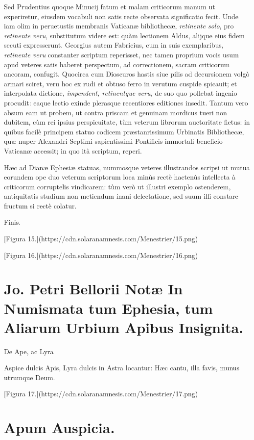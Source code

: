 \documentclass[a4paper, 11pt, oneside, polutonikogreek, latin]{article}
\begin{document}
Sed Prudentius quoque Minucij fatum et malam criticorum manum ut experiretur, eiusdem vocabuli non satis recte observata significatio fecit. Unde iam olim in peruetustis membranis Vaticanæ bibliothecæ, \emph{retinente solo}, pro \emph{retinente veru}, substitutum videre est: quàm lectionem Aldus, alijque eius fidem secuti expresserunt. Georgius autem Fabricius, cum in suis exemplaribus, \emph{retinente veru} constanter scriptum reperisset, nec tamen proprium vocis usum apud veteres satis haberet perspectum, ad correctionem, sacram criticorum ancoram, confugit. Quocirca cum Dioscuros hastis siue pilis ad decursionem volgò armari sciret, veru hoc ex rudi et obtuso ferro in verutum cuspide spicauit; et interpolata dictione, \emph{impendent, retinentque veru,} de suo quo pollebat ingenio procudit: eaque lectio exinde plerasque recentiores editiones insedit. Tantum vero absum eam ut probem, ut contra priscam et genuinam mordicus tueri non dubitem, cùm rei ipsius perspicuitate, tùm veterum librorum auctoritate fietus: in quibus facilè principem statuo codicem præstanrissimum Urbinatis Bibliothecæ, quæ nuper Alexandri Septimi sapientissimi Pontificis immortali beneficio Vaticanæ accessit; in quo ità scriptum, reperi.

Hæc ad Dianæ Ephesiæ statuas, nummosque veteres illustrandos scripsi ut mutua eorundem ope duo veterum scriptorum loca minùs rectè hactenùs intellecta à criticorum corruptelis vindicarem: tùm verò ut illustri exemplo ostenderem, antiquitatis studium non metiendum inani delectatione, sed suum illi constare fructum si rectè colatur.

Finis.

[Figura 15.](https://cdn.solaranamnesis.com/Menestrier/15.png)

[Figura 16.](https://cdn.solaranamnesis.com/Menestrier/16.png)
\clearpage
\section{Jo. Petri Bellorii Notæ In Numismata tum Ephesia, tum Aliarum Urbium Apibus Insignita.}
\paragraph{}
De Ape, ac Lyra

Aspice dulcis Apis, Lyra dulcis in Astra locantur: Hæc cantu, illa favis, munus utrumque Deum.

[Figura 17.](https://cdn.solaranamnesis.com/Menestrier/17.png)
\clearpage
\section{Apum Auspicia.}
\end{document}
